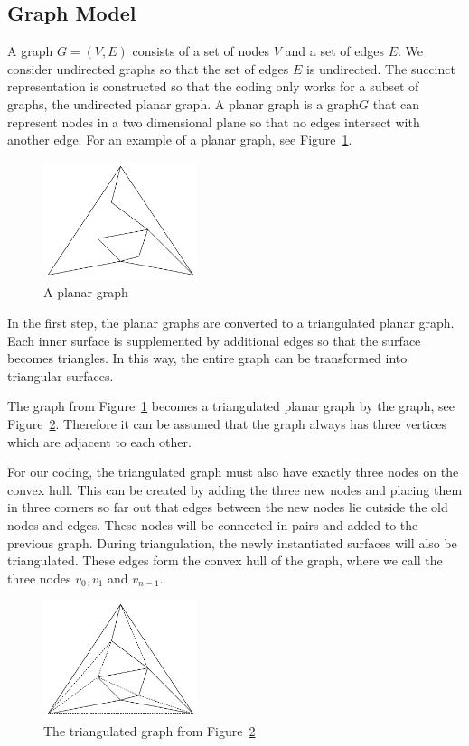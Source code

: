 \documentclass[a4paper]{scrartcl}
\begin{document}
\subsection{Graph Model}
A graph $G=(V,E)$ consists of a set of nodes $V$ and a set of edges $E$. We consider undirected graphs so that the set of edges $E$ is undirected.
The succinct representation is constructed so that the coding only works for a subset of graphs, the undirected planar graph. A planar graph is a  graph$G$ that can represent nodes in a two dimensional plane so that no edges intersect with another edge. For an example of a planar graph, see Figure~\ref{fig:planar}.


\begin{figure}[h]
	\centering
	\includegraphics[width=0.4\textwidth]{img/planar}
	\caption{A planar graph}
	\label{fig:planar}
\end{figure}


In the first step, the planar graphs are converted to a triangulated planar graph. Each inner surface is supplemented by additional edges so that the surface becomes triangles. In this way, the entire graph can be transformed into triangular surfaces. 


The graph from Figure~\ref{fig:planar} becomes a triangulated planar graph by the graph, see Figure~\ref{fig:triangulated}.
Therefore it can be assumed that the graph always has three vertices which are adjacent to each other.


For our coding, the triangulated graph must also have exactly three nodes on the convex hull. This can be created by adding the three new nodes and placing them in three corners so far out that edges between the new nodes lie outside the old nodes and edges. These nodes will be connected in pairs and added to the previous graph. During triangulation, the newly instantiated surfaces will also be triangulated.
 These edges form the convex hull of the graph, where we call the three nodes $v_0,v_1$ and $v_{n-1}$.



\begin{figure}[h]
	\centering
	\includegraphics[width=0.4\textwidth]{img/triangulated}
	\caption{The triangulated  graph from Figure~\ref{fig:triangulated}}
	\label{fig:triangulated}
\end{figure}
\end{document}

